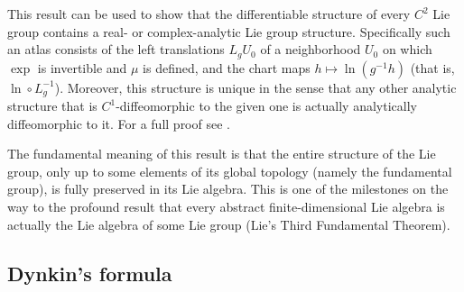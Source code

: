 \begin{rem}
    This result can be used to show that the differentiable structure of every $C^2$ Lie group contains a real- or complex-analytic Lie group structure. Specifically such an atlas consists of the left translations $L_g U_0$ of a neighborhood $U_0$ on which $\exp$ is invertible and $\mu$ is defined, and the chart maps $h\mapsto \ln(g^{-1}h)$ (that is, $\ln\circ L_g^{-1}$). Moreover, this structure is unique in the sense that any other analytic structure that is $C^1$-diffeomorphic to the given one is actually analytically diffeomorphic to it. For a full proof see \cite[Thm.~1.6.3, Prop.~1.6.4]{DK}.
\end{rem}

\begin{rem}
    The fundamental meaning of this result is that the entire structure of the Lie group, only up to some elements of its global topology (namely the fundamental group), is fully preserved in its Lie algebra. This is one of the milestones on the way to the profound result that every abstract finite-dimensional Lie algebra is actually the Lie algebra of some Lie group (Lie's Third Fundamental Theorem).
\end{rem}






\subsection{Dynkin's formula}

